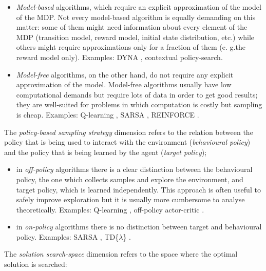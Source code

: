 \begin{itemize}
\item \emph{Model-based} algorithms, which require an explicit approximation of the model of the \gls{MDP}. Not every model-based algorithm is equally demanding on this matter: some of them might need information about every element of the \gls{MDP} (transition model,  reward model, initial state distribution, etc.) while others might require approximations only for a fraction of them (e. g.the reward model only). Examples: DYNA \cite{sutton1991dyna}, contextual policy-search\cite{kupcsik2013data}.
\item \emph{Model-free} algorithms, on the other hand, do not require any explicit approximation of the model. Model-free algorithms usually have low computational demands but require lots of data in order to get good results; they are well-suited for problems in which computation is costly but sampling is cheap. Examples: Q-learning \cite{watkins1989learning}, SARSA \cite{rummery1994line}, REINFORCE \cite{williams1992simple}.
\end{itemize}

The \emph{policy-based sampling strategy} dimension refers to the relation between the policy that is being used to interact with the environment (\emph{behavioural policy}) and the policy that is being learned by the agent (\emph{target policy});

\begin{itemize}
\item in \emph{off-policy} algorithms there is a clear distinction between the behavioural policy, the one which collects samples and explore the environment, and target policy, which is learned independently. This approach is often useful to safely improve exploration but it is usually more cumbersome to analyse theoretically. Examples: Q-learning \cite{watkins1989learning}, off-policy actor-critic \cite{degris2012off}.
\item in \emph{on-policy} algorithms there is no distinction between target and behavioural policy. Examples: SARSA \cite{rummery1994line}, TD\{$\lambda$\} \cite{sutton1988learning}.
\end{itemize}

The \emph{solution search-space} dimension refers to the space where the optimal solution is searched:


